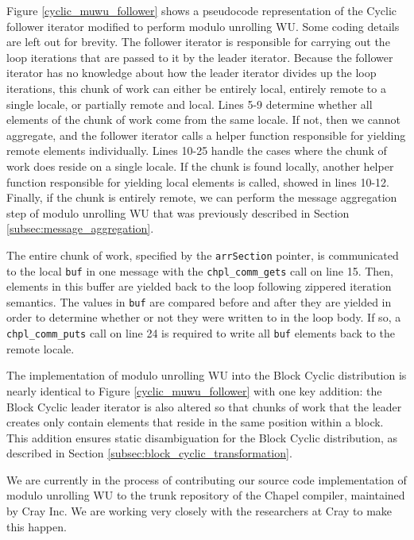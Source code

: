 Figure \ref{cyclic_muwu_follower} shows a pseudocode representation of the Cyclic follower iterator modified to perform modulo unrolling WU. Some coding details are left out for brevity. The follower iterator is responsible for carrying out the loop iterations that are passed to it by the leader iterator. Because the follower iterator has no knowledge about how the leader iterator divides up the loop iterations, this chunk of work can either be entirely local, entirely remote to a single locale, or partially remote and local. Lines 5-9 determine whether all elements of the chunk of work come from the same locale. If not, then we cannot aggregate, and the follower iterator calls a helper function responsible for yielding remote elements individually. Lines 10-25 handle the cases where the chunk of work does reside on a single locale. If the chunk is found locally, another helper function responsible for yielding local elements is called, showed in lines 10-12. Finally, if the chunk is entirely remote, we can perform the message aggregation step of modulo unrolling WU that was previously described in Section \ref{subsec:message_aggregation}. 

The entire chunk of work, specified by the \texttt{arrSection} pointer, is communicated to the local \texttt{buf} in one message with the \texttt{chpl\_comm\_gets} call on line 15. Then, elements in this buffer are yielded back to the loop following zippered iteration semantics. The values in \texttt{buf} are compared before and after they are yielded in order to determine whether or not they were written to in the loop body. If so, a \texttt{chpl\_comm\_puts} call on line 24 is required to write all \texttt{buf} elements back to the remote locale.

The implementation of modulo unrolling WU into the Block Cyclic distribution is nearly identical to Figure \ref{cyclic_muwu_follower} with one key addition: the Block Cyclic leader iterator is also altered so that chunks of work that the leader creates only contain elements that reside in the same position within a block. This addition ensures static disambiguation for the Block Cyclic distribution, as described in Section \ref{subsec:block_cyclic_transformation}.

We are currently in the process of contributing our source code implementation of modulo unrolling WU to the trunk repository of the Chapel compiler, maintained by Cray Inc. We are working very closely with the researchers at Cray to make this happen. 

